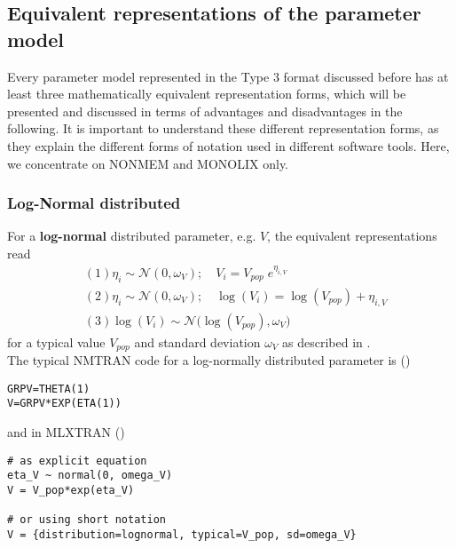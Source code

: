 

\subsection{Equivalent representations of the parameter model}
Every parameter model represented in the Type 3 format discussed before has at least three mathematically equivalent representation forms,
which will be presented and discussed in terms of advantages and disadvantages in the following. It is important to understand these different
representation forms, as they explain the different forms of notation used in different software tools. Here, we concentrate on NONMEM and MONOLIX only.


\subsubsection{Log-Normal distributed}
For a \textbf{log-normal} distributed parameter, e.g. $V$, the equivalent representations read
\begin{align*}
&(1) \eta_i \sim \mathcal{N}(0,\omega_V); \quad V_i= V_{pop} \; e^{\eta_{i,V}}   \\
&(2) \eta_i \sim \mathcal{N}(0,\omega_V); \quad \log( V_i ) = \log( V_{pop} ) + \eta_{i,V}  \\
&(3) \log( V_i ) \sim \mathcal{N}\big( \log( V_{pop} ),\omega_V\big)
\end{align*}
for a typical value $V_{pop}$ and standard deviation $\omega_V$ as described in \cite{Lavielle:2012b}.\\
The typical NMTRAN code for a log-normally distributed parameter is (\cite{Smith:2012aa})
\begin{lstlisting}
GRPV=THETA(1)
V=GRPV*EXP(ETA(1))
\end{lstlisting}
and in MLXTRAN (\cite{MonolixOverview:2012})
\begin{lstlisting}
# as explicit equation
eta_V ~ normal(0, omega_V)
V = V_pop*exp(eta_V)

# or using short notation
V = {distribution=lognormal, typical=V_pop, sd=omega_V}
\end{lstlisting}

